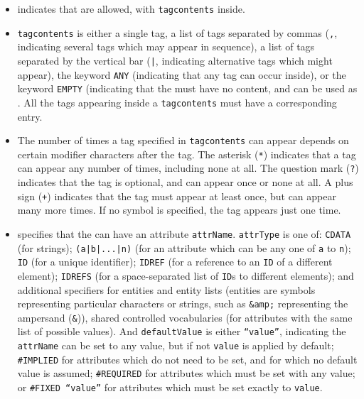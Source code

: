 		\begin{itemize}
			\item {} indicates that
			 are allowed, with \texttt{tagcontents}
			inside.
			
			 \item \texttt{tagcontents} is either a single tag, a
			list of tags separated by commas (\texttt{,},
			indicating several tags which may appear in sequence),
			a list of tags separated by the vertical bar
			(\texttt{|}, indicating alternative tags which might
			appear), the keyword \texttt{ANY} (indicating that any
			tag can occur inside), or the keyword \texttt{EMPTY}
			(indicating that the  must have no content,
			and can be used as . All the tags
			appearing inside a \texttt{tagcontents} must have a
			corresponding  entry.
			
			 \item The number of times a tag specified in
			\texttt{tagcontents} can appear depends on certain
			modifier characters after the tag. The asterisk
			(\texttt{*}) indicates that a tag can appear any number
			of times, including none at all. The question mark
			(\texttt{?}) indicates that the tag is optional, and
			can appear once or none at all. A plus sign
			(\texttt{+}) indicates that the tag must appear at
			least once, but can appear many more times. If no
			symbol is specified, the tag appears just one time.
			
			 \item {}
			specifies that the  can have an attribute
			\texttt{attrName}. \texttt{attrType} is one of:
			\texttt{CDATA} (for strings); \texttt{(a|b|...|n)} (for
			an attribute which can be any one of \texttt{a} to
			\texttt{n}); \texttt{ID} (for a unique identifier);
			\texttt{IDREF} (for a reference to an \texttt{ID} of a
			different element); \texttt{IDREFS} (for a
			space-separated list of \texttt{ID}s to different
			elements); and additional specifiers for entities and
			entity lists (entities are symbols representing
			particular characters or strings, such as
			\texttt{\&amp;} representing the ampersand
			(\texttt{\&})), shared controlled vocabularies (for
			attributes with the same list of possible values). And
			\texttt{defaultValue} is either \texttt{``value''},
			indicating the \texttt{attrName} can be set to any
			value, but if not \texttt{value} is applied by default;
			\texttt{\#IMPLIED} for attributes which do not need to
			be set, and for which no default value is assumed;
			\texttt{\#REQUIRED} for attributes which must be set
			with any value; or \texttt{\#FIXED ``value''} for
			attributes which must be set exactly to \texttt{value}.
		\end{itemize}
		
